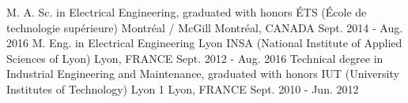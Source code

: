 

\begin{cventries}


\cventry
{M. A. Sc. in Electrical Engineering, graduated with honors} %
{ÉTS (École de technologie supérieure) Montréal / McGill} %
{Montréal, CANADA} %
{Sept. 2014 - Aug. 2016} %
{ %
}
\vspace{-1.5mm}
\cventry
{M. Eng. in Electrical Engineering} %
{Lyon INSA (National Institute of Applied Sciences of Lyon)} %
{Lyon, FRANCE} %
{Sept. 2012 - Aug. 2016} %
{ %
}
\vspace{-1mm}
\cventry
{Technical degree in Industrial Engineering and Maintenance, graduated with honors} %
{IUT (University Institutes of Technology) Lyon 1} %
{Lyon, FRANCE} %
{Sept. 2010 - Jun. 2012} %
{ %
}
\vspace{-5mm}
\end{cventries}
